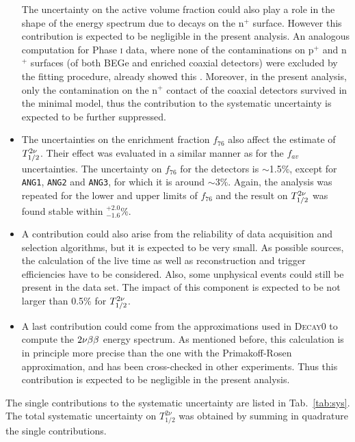 \begin{itemize}
		The uncertainty on the active volume fraction could also play a role in the shape of the energy spectrum due to  decays on the n$^+$ surface. However this contribution is expected to be negligible in the present analysis. An analogous computation for {\gerda} Phase \textsc{i} data, where none of the  contaminations on p$^+$ and n$^+$ surfaces (of both BEGe and enriched coaxial detectors) were excluded by the fitting procedure, already showed this \cite{sabine}. Moreover, in the present analysis, only the  contamination on the n$^+$ contact of the coaxial detectors survived in the minimal model, thus the contribution to the systematic uncertainty is expected to be further suppressed.
	\item The uncertainties on the enrichment fraction $f_{76}$ also affect the estimate of $T_{1/2}^{2\nu}$. Their effect was evaluated in a similar manner as for the $f_{av}$ uncertainties. The uncertainty on $f_{76}$ for the detectors is $\sim$1.5\%, except for \texttt{ANG1}, \texttt{ANG2} and \texttt{ANG3}, for which it is around $\sim$3\%. Again, the analysis was repeated for the lower and upper limits of $f_{76}$ and the result on $T_{1/2}^{2\nu}$ was found stable within $^{+2.0}_{-1.6}\%$.
	\item A contribution could also arise from the reliability of data acquisition and selection algorithms, but it is expected to be very small. As possible sources, the calculation of the live time as well as reconstruction and trigger efficiencies have to be considered. Also, some unphysical events could still be present in the data set. The impact of this component is expected to be not larger than 0.5\% for $T_{1/2}^{2\nu}$.
	\item A last contribution could come from the approximations used in \textsc{Decay0} to compute the $2\nu\beta\beta$ energy spectrum. As mentioned before, this calculation is in principle more precise than the one with the Primakoff-Rosen approximation, and has been cross-checked in other experiments. Thus this contribution is expected to be negligible in the present analysis.
\end{itemize}

The single contributions to the systematic uncertainty are listed in Tab.~\ref{tab:sys}. The total systematic uncertainty on $T_{1/2}^{2\nu}$ was obtained by summing in quadrature the single contributions.

